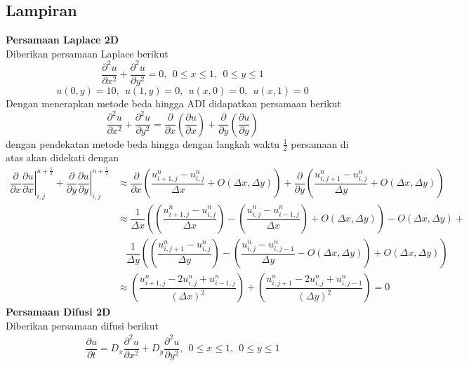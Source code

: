 	\begin{center}
		\section*{Lampiran}
	\end{center}
	\textbf{{Persamaan Laplace 2D}}\\
Diberikan persamaan Laplace berikut
$$ \dfrac{\partial^2 u}{\partial x^2} + \dfrac{\partial^2 u}{\partial y^2}= 0, ~~ 0\leq x \leq 1,~~ 0\leq y \leq 1$$
$$ u(0,y)=10, ~~u(1,y)=0, ~~ u(x,0)=0, ~~u(x,1)=0$$
Dengan menerapkan metode beda hingga ADI didapatkan persamaan berikut
$$ \dfrac{\partial^2 u}{\partial x^2} + \dfrac{\partial^2 u}{\partial y^2}= \dfrac{\partial}{\partial x}\left ( \dfrac{\partial u}{\partial x}\right )+\dfrac{\partial}{\partial y}\left ( \dfrac{\partial u}{\partial y}\right )$$
dengan pendekatan metode beda hingga dengan langkah waktu $ \frac{1}{2} $ persamaan di atas akan didekati dengan
\begin{align*}
	\dfrac{\partial}{\partial x} \left. \dfrac{\partial u}{\partial x} \right |_{i,j}^{n+\frac{1}{2}}+ \dfrac{\partial}{\partial y} \left. \dfrac{\partial u}{\partial y} \right |_{i,j}^{n+\frac{1}{2}} & \approx 
	\dfrac{\partial}{\partial x} \left( \dfrac{u_{i+1,j}^{n} - u_{i,j}^{n}}{\Delta x}+O(\Delta x,\Delta y)\right) + 
	\dfrac{\partial}{\partial y} \left( \dfrac{u_{i,j+1}^{n} - u_{i,j}^{n}}{\Delta y}+O(\Delta x,\Delta y) \right) \\
	&\approx 
	\dfrac{1}{\Delta x} \left( \left( \dfrac{u_{i+1,j}^{n}-u_{i,j}^{n}} {{\Delta x}}\right)  - \left( \dfrac{u_{i,j}^{n}-u_{i-1,j}^{n}} {{\Delta x}}\right)+O(\Delta x,\Delta y) \right) -O(\Delta x,\Delta y)+ \\
	&~~~~\dfrac{1}{\Delta y} \left( \left( \dfrac{u_{i,j+1}^{n}-u_{i,j}^{n}}{{\Delta y}}\right)  - \left( \dfrac{u_{i,j}^{n}-u_{i,j-1}^{n}}{{\Delta y}}-O(\Delta x,\Delta y)\right) +O(\Delta x,\Delta y)\right) \\
	& \approx 
	\left( \dfrac{u_{i+1,j}^{n} - 2u_{i,j}^{n}+u_{i-1,j}^{n}}{(\Delta x)^2}\right) + 
	\left( \dfrac{u_{i,j+1}^{n} - 2u_{i,j}^{n}+u_{i,j-1}^{n}}{(\Delta y)^2}\right) =0
\end{align*}
\textbf{{Persamaan Difusi 2D}}\\
Diberikan persamaan difusi berikut
\begin{align}
	\dfrac{\partial u}{\partial t}= D_x\dfrac{\partial^2 u}{\partial x^2} + D_y \dfrac{\partial^2 u}{\partial y^2}, ~~ 0\leq x \leq 1,~~ 0\leq y \leq 1 \label{d1}
\end{align}
